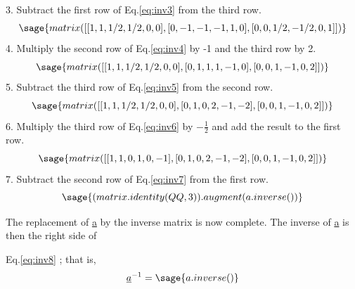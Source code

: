 \documentclass[12pt]{report}
\newcommand{\lab}[1]{
Eq.\ref{#1}
}
\begin{document}
3. Subtract the first row of \lab{eq:inv3} from the third row.
\begin{equation}\sage{matrix([[1,1,1/2,1/2,0,0],[0,-1,-1,-1,1,0],[0,0,1/2,-1/2,0,1]])}\label{eq:inv4}\end{equation}
4. Multiply the second row of \lab{eq:inv4} by -1 and the third row by 2.
\begin{equation}\sage{matrix([[1,1,1/2,1/2,0,0],[0,1,1,1,-1,0],[0,0,1,-1,0,2]])}\label{eq:inv5}\end{equation}
5. Subtract the third row of \lab{eq:inv5} from the second row.
\begin{equation}\sage{matrix([[1,1,1/2,1/2,0,0],[0,1,0,2,-1,-2],[0,0,1,-1,0,2]])}\label{eq:inv6}\end{equation}
6. Multiply the third row of \lab{eq:inv6} by $-\frac{1}{2}$ and add the
result to the first row.
\begin{equation}\sage{matrix([[1,1,0,1,0,-1],[0,1,0,2,-1,-2],[0,0,1,-1,0,2]])}\label{eq:inv7}\end{equation}
7. Subtract the second row of \lab{eq:inv7} from the first row.
\begin{equation} \sage{(matrix.identity(QQ,3)).augment(a.inverse())}\label{eq:inv8}\end{equation}

The replacement of \underline{a} by the inverse matrix is now
complete. The inverse of \underline{a} is then the right side of
\lab{eq:inv8}; that is,
\begin{equation}\underline{a}^{-1} = \sage{a.inverse()}\end{equation}
\end{document}
